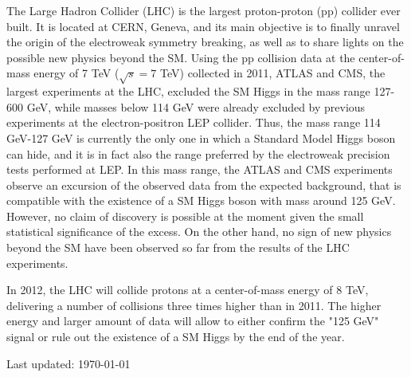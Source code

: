 \documentclass[10pt, a4paper]{article}
\begin{document}
The Large Hadron Collider (LHC) is the largest proton-proton (pp) collider ever built. 
It is located at CERN, Geneva, and its main objective is to finally unravel the origin 
of the electroweak symmetry breaking, as well as to share lights on the possible 
new physics beyond the SM. Using the pp collision data at the center-of-mass energy
of 7 TeV ($\sqrt{s}=7$ TeV) collected in 2011, ATLAS and CMS, the 
largest experiments at the LHC, excluded the SM Higgs in the mass range 
127-600 GeV, while masses below 114 GeV were already excluded by 
previous experiments at the electron-positron LEP collider. 
Thus, the mass range 114 GeV-127 GeV is currently the only one in which 
a Standard Model Higgs boson can hide, and it is in fact also the range 
preferred by the electroweak precision tests performed at LEP. 
In this mass range, the ATLAS and CMS experiments observe an excursion of 
the observed data from the expected background, that is compatible with the existence 
of a SM Higgs boson with mass around 125 GeV. However, no claim of 
discovery is possible at the moment given the small statistical significance of the excess. 
On the other hand, no sign of new physics beyond the SM have been observed so far
from the results of the LHC experiments.

In 2012, the LHC will collide protons at a center-of-mass energy of 8 TeV, delivering 
a number of collisions three times higher than in 2011. The higher energy and larger 
amount of data will allow to either confirm the "125 GeV" signal or rule out the existence 
of a SM Higgs by the end of the year. 









 
 
\vfill{}
\hrulefill

\begin{center}
{\footnotesize Last updated: \today}
\end{center}
\end{document}
